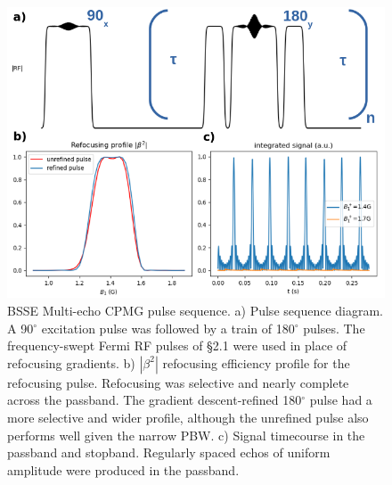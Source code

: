 \documentclass{article}
\begin{document}
\begin{figure}[h]
\centering
\includegraphics[width=1\textwidth]{figures/cpmg_oneb1_refined_processed.png}
\caption{BSSE Multi-echo CPMG pulse sequence. 
a) Pulse sequence diagram. A 90$^\circ$ excitation pulse was followed by a train of 180$^\circ$ pulses. 
The frequency-swept Fermi RF pulses of \S 2.1 were used in place of refocusing gradients. 
b) $|\beta^2|$ refocusing efficiency profile for the refocusing pulse. 
Refocusing was selective and nearly complete across the passband. 
The gradient descent-refined 180$^\circ$ pulse had a more selective and wider profile, 
although the unrefined pulse also performs well given the narrow PBW. 
c) Signal timecourse in the passband and stopband. 
Regularly spaced echos of uniform amplitude were produced in the passband.}
\label{fig:cpmg}
\end{figure}
\end{document}

